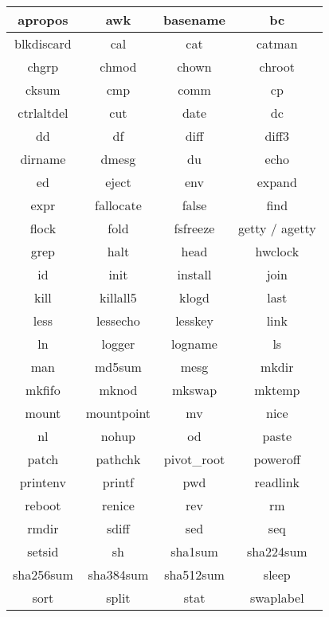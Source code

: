 \begin{center}
    \begin{tabular}{|c|c|c|c|}
        \hline
        apropos & awk & basename & bc \\
        \hline
        blkdiscard & cal & cat & catman \\
        \hline
        chgrp & chmod & chown & chroot \\
        \hline
        cksum & cmp & comm & cp \\
        \hline
        ctrlaltdel & cut & date & dc \\
        \hline
        dd & df & diff & diff3 \\
        \hline
        dirname & dmesg & du & echo \\
        \hline
        ed & eject & env & expand \\
        \hline
        expr & fallocate & false & find \\
        \hline
        flock & fold & fsfreeze & getty / agetty \\
        \hline
        grep & halt & head & hwclock \\
        \hline
        id & init & install & join \\
        \hline
        kill & killall5 & klogd & last \\
        \hline
        less & lessecho & lesskey & link \\
        \hline
        ln & logger & logname & ls \\
        \hline
        man & md5sum & mesg & mkdir \\
        \hline
        mkfifo & mknod & mkswap & mktemp \\
        \hline
        mount & mountpoint & mv & nice \\
        \hline
        nl & nohup & od & paste \\
        \hline
        patch & pathchk & pivot\_root & poweroff \\
        \hline
        printenv & printf & pwd & readlink \\
        \hline
        reboot & renice & rev & rm \\
        \hline
        rmdir & sdiff & sed & seq \\
        \hline
        setsid & sh & sha1sum & sha224sum \\
        \hline
        sha256sum & sha384sum & sha512sum & sleep \\
        \hline
        sort & split & stat & swaplabel \\

\end{tabular}
\end{center}
